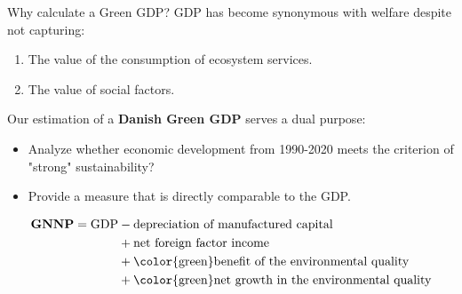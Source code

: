 \begin{frame}{Why calculate a Green GDP?}
  GDP has become synonymous with welfare despite not capturing:\par
  \begin{enumerate}
    \item The value of the consumption of ecosystem services.
    \item The value of social factors.
  \end{enumerate}
  Our estimation of a \textbf{Danish Green GDP} serves a dual purpose:
  \begin{itemize}
    \item Analyze whether economic development from 1990-2020 meets the criterion of "strong" sustainability?
    \item Provide a measure that is directly comparable to the GDP.
  \end{itemize}
  \begin{tcolorbox}
    \begin{align*}
        \textbf{GNNP} = \text{GDP} &- \text{depreciation of manufactured capital} \\
        &+ \text{net foreign factor income} \\
        &+ \text{\color{green}benefit of the environmental quality} \\
        &+ \text{\color{green}net growth in the environmental quality}
    \end{align*}
  \end{tcolorbox}
\end{frame}